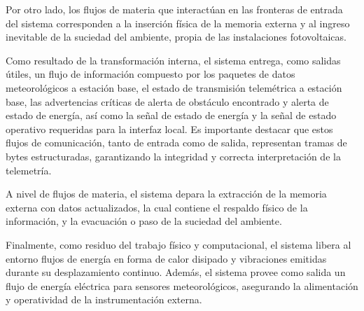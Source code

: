\documentclass[../../General.tex]{subfiles}
\begin{document}
Por otro lado, los flujos de materia que interactúan en las fronteras de entrada del sistema corresponden a la inserción física de la memoria externa y al ingreso inevitable de la suciedad del ambiente, propia de las instalaciones fotovoltaicas.

Como resultado de la transformación interna, el sistema entrega, como salidas útiles, un flujo de información compuesto por los paquetes de datos meteorológicos a estación base, el estado de transmisión telemétrica a estación base, las advertencias críticas de alerta de obstáculo encontrado y alerta de estado de energía, así como la señal de estado de energía y la señal de estado operativo requeridas para la interfaz local. Es importante destacar que estos flujos de comunicación, tanto de entrada como de salida, representan tramas de bytes estructuradas, garantizando la integridad y correcta interpretación de la telemetría.

A nivel de flujos de materia, el sistema depara la extracción de la memoria externa con datos actualizados, la cual contiene el respaldo físico de la información, y la evacuación o paso de la suciedad del ambiente.

Finalmente, como residuo del trabajo físico y computacional, el sistema libera al entorno flujos de energía en forma de calor disipado y vibraciones emitidas durante su desplazamiento continuo. Además, el sistema provee como salida un flujo de energía eléctrica para sensores meteorológicos, asegurando la alimentación y operatividad de la instrumentación externa.
\end{document}
